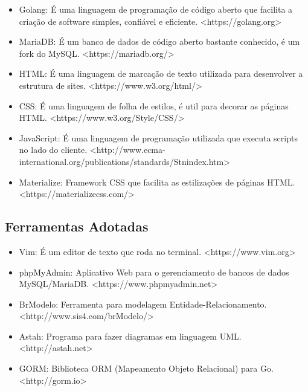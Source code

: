 \documentclass[12pt]{article}
\begin{document}
\begin{titlepage}
\begin{center}
\begin{itemize}
	\item Golang: É uma linguagem de programação de código aberto que facilita a criação de software simples, confiável e eficiente. <https://golang.org>	
	\item MariaDB: É um banco de dados de código aberto bastante conhecido, é um fork do MySQL. <https://mariadb.org/>
	\item HTML: É uma linguagem de marcação de texto utilizada para desenvolver a estrutura de sites. <https://www.w3.org/html/>
	\item CSS: É uma linguagem de folha de estilos, é util para decorar as páginas HTML. 
<https://www.w3.org/Style/CSS/>
	\item JavaScript: É uma linguagem de programação utilizada que executa scripts no lado do cliente. 
<http://www.ecma-international.org/publications/standards/Stnindex.htm>
	\item Materialize: Framework CSS que facilita as estilizações de páginas HTML. <https://materializecss.com/>
\end{itemize}

\subsection{Ferramentas Adotadas}

\begin{itemize}
	\item Vim: É um editor de texto que roda no terminal. <https://www.vim.org>
	\item phpMyAdmin: Aplicativo Web para o gerenciamento de bancos de dados MySQL/MariaDB. <https://www.phpmyadmin.net>
	\item BrModelo: Ferramenta para modelagem Entidade-Relacionamento. <http://www.sis4.com/brModelo/>
	\item Astah: Programa para fazer diagramas em linguagem UML. <http://astah.net>
	\item GORM: Biblioteca ORM (Mapeamento Objeto Relacional) para Go. <http://gorm.io>
\end{itemize}

\newpage


\end{center}
\end{titlepage}
\end{document}
